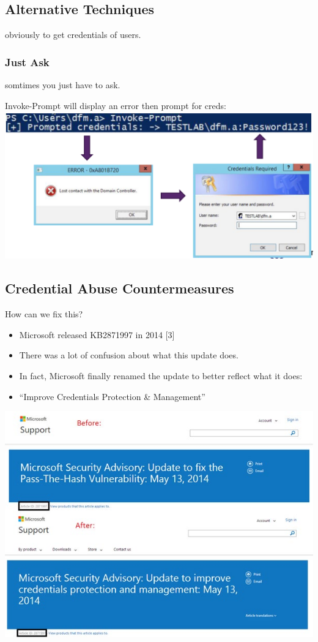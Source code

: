 \subsection{Alternative Techniques}
obviously to get credentials of users.

\subsubsection*{Just Ask}
somtimes you just have to ask. 

Invoke-Prompt will display an error then prompt for creds:
\includegraphics[width=\textwidth]{resources/11-mimikatz-just-ask.png}

\subsection{Credential Abuse Countermeasures}
How can we fix this?

\begin{itemize}
    \item Microsoft released KB2871997 in 2014 [3]
    \item There was a lot of confusion about what this update does.
    \item In fact, Microsoft finally renamed the update to better reflect what it does:
    \item “Improve Credentials Protection \& Management”
\end{itemize}
\begin{center}
    \includegraphics[width=\textwidth]{resources/11-just-ask-microsoft-response.png}
\end{center}

